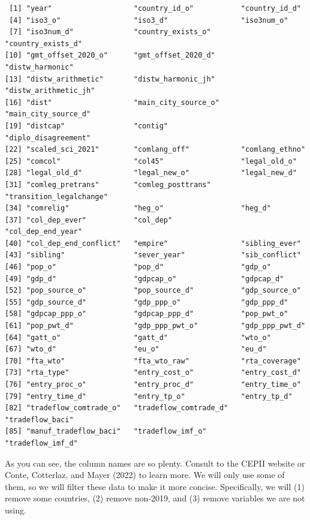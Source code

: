 \documentclass[
  a4paper,
  DIV=11,
  numbers=noendperiod]{scrreprt}
\begin{document}
\begin{verbatim}
 [1] "year"                   "country_id_o"           "country_id_d"          
 [4] "iso3_o"                 "iso3_d"                 "iso3num_o"             
 [7] "iso3num_d"              "country_exists_o"       "country_exists_d"      
[10] "gmt_offset_2020_o"      "gmt_offset_2020_d"      "distw_harmonic"        
[13] "distw_arithmetic"       "distw_harmonic_jh"      "distw_arithmetic_jh"   
[16] "dist"                   "main_city_source_o"     "main_city_source_d"    
[19] "distcap"                "contig"                 "diplo_disagreement"    
[22] "scaled_sci_2021"        "comlang_off"            "comlang_ethno"         
[25] "comcol"                 "col45"                  "legal_old_o"           
[28] "legal_old_d"            "legal_new_o"            "legal_new_d"           
[31] "comleg_pretrans"        "comleg_posttrans"       "transition_legalchange"
[34] "comrelig"               "heg_o"                  "heg_d"                 
[37] "col_dep_ever"           "col_dep"                "col_dep_end_year"      
[40] "col_dep_end_conflict"   "empire"                 "sibling_ever"          
[43] "sibling"                "sever_year"             "sib_conflict"          
[46] "pop_o"                  "pop_d"                  "gdp_o"                 
[49] "gdp_d"                  "gdpcap_o"               "gdpcap_d"              
[52] "pop_source_o"           "pop_source_d"           "gdp_source_o"          
[55] "gdp_source_d"           "gdp_ppp_o"              "gdp_ppp_d"             
[58] "gdpcap_ppp_o"           "gdpcap_ppp_d"           "pop_pwt_o"             
[61] "pop_pwt_d"              "gdp_ppp_pwt_o"          "gdp_ppp_pwt_d"         
[64] "gatt_o"                 "gatt_d"                 "wto_o"                 
[67] "wto_d"                  "eu_o"                   "eu_d"                  
[70] "fta_wto"                "fta_wto_raw"            "rta_coverage"          
[73] "rta_type"               "entry_cost_o"           "entry_cost_d"          
[76] "entry_proc_o"           "entry_proc_d"           "entry_time_o"          
[79] "entry_time_d"           "entry_tp_o"             "entry_tp_d"            
[82] "tradeflow_comtrade_o"   "tradeflow_comtrade_d"   "tradeflow_baci"        
[85] "manuf_tradeflow_baci"   "tradeflow_imf_o"        "tradeflow_imf_d"       
\end{verbatim}

As you can see, the column names are so plenty. Consult to the CEPII
website or Conte, Cotterlaz, and Mayer (2022) to learn more. We will
only use some of them, so we will filter these data to make it more
concise. Specifically, we will (1) remove some countries, (2) remove
non-2019, and (3) remove variables we are not using.
\end{document}
